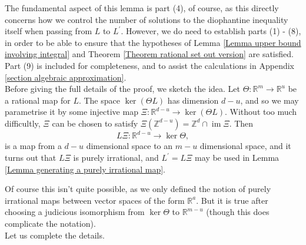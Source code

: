 \documentclass[12pt,a4paper,twoside,reqno]{amsart}
\newcommand{\im}{\operatorname{im}}
\numberwithin{equation}{section}
\begin{document}
\noindent The fundamental aspect of this lemma is part (4), of course, as this directly concerns how we control the number of solutions to the diophantine inequality itself when passing from $L$ to $L^\prime$. However, we do need to establish parts (1) - (8), in order to be able to ensure that the hypotheses of Lemma \ref{Lemma upper bound involving integral} and Theorem \ref{Theorem rational set out version} are satisfied. Part (9) is included for completeness, and to assist the calculations in Appendix \ref{section algebraic approximation}. \\

Before giving the full details of the proof, we sketch the idea. Let $\Theta:\mathbb{R}^m \longrightarrow \mathbb{R}^u$ be a rational map for $L$. The space $\ker (\Theta L)$ has dimension $d-u$, and so we may parametrise it by some injective map $\Xi:\mathbb{R}^{d-u} \longrightarrow \ker (\Theta L)$. Without too much difficultly, $\Xi$ can be chosen to satisfy $\Xi(\mathbb{Z}^{d-u}) = \mathbb{Z}^d \cap \im \Xi$. Then \[ L\Xi: \mathbb{R}^{d-u} \longrightarrow \ker \Theta,\] is a map from a $d-u$ dimensional space to an $m-u$ dimensional space, and it turns out that $L\Xi$ is purely irrational, and $L^\prime = L\Xi$ may be used in Lemma \ref{Lemma generating a purely irrational map}.

Of course this isn't quite possible, as we only defined the notion of purely irrational maps between vector spaces of the form $\mathbb{R}^a$. But it is true after choosing a judicious isomorphism from $\ker \Theta$ to $\mathbb{R}^{m-u}$ (though this does complicate the notation). \\

Let us complete the details. 
\end{document}
